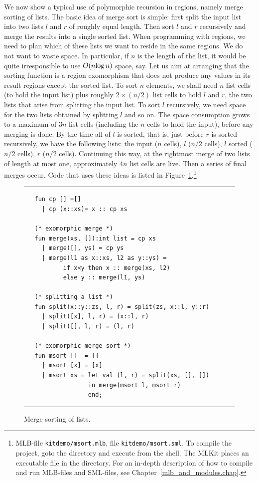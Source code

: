 \documentclass[12pt]{book}
\begin{document}
We now show a typical use of polymorphic recursion in regions, namely
merge sorting of lists. The basic idea of merge sort is simple: first
split the input list into two lists $l$ and $r$ of roughly equal
length.  Then sort $l$ and $r$ recursively and merge the results into
a single sorted list.  When programming with regions, we need to plan
which of these lists we want to reside in the same regions. We do not
want to waste space. In particular, if $n$ is the length of the list,
it would be quite irresponsible to use $O(n\hbox{log}\,n)$ space, say.
Let us aim at arranging that the sorting function is a region
exomorphism that does not produce any values in its result regions
except the sorted list. To sort $n$ elements, we shall need $n$ list
cells (to hold the input list) plus roughly $2\times(n/2)$ list cells
to hold $l$ and $r$, the two lists that arise from splitting the input
list. To sort $l$ recursively, we need space for the two lists
obtained by splitting $l$ and so on. The space consumption grows to a
maximum of $3n$ list cells (including the $n$ cells to hold the
input), before any merging is done.  By the time all of $l$ is sorted,
that is, just before $r$ is sorted recursively, we have the following
lists: the input ($n$ cells), $l$ ($n/2$ cells), $l$ sorted ($n/2$
cells), $r$ ($n/2$ cells). Continuing this way, at the rightmost merge
of two lists of length at most one, approximately $4n$ list cells are
live.  Then a series of final merges occur.  Code that uses these
ideas is listed in 
%
%
%
%
%
Figure~\ref{msort.fig}.\footnote{MLB-file {\tt kitdemo/msort.mlb}, file
  {\tt kitdemo/msort.sml}. To compile the project, goto the
   directory and execute  from
  the shell. The MLKit places an executable file  in the
   directory. For an in-depth description of how to
  compile and run MLB-files and SML-files, see
  Chapter~\ref{mlb_and_modules.chap}.}
\begin{figure}[hbt]
\hrule
\medskip
\begin{verbatim}
   fun cp [] =[]
     | cp (x::xs)= x :: cp xs

   (* exomorphic merge *)
   fun merge(xs, []):int list = cp xs
     | merge([], ys) = cp ys
     | merge(l1 as x::xs, l2 as y::ys) = 
           if x<y then x :: merge(xs, l2) 
           else y :: merge(l1, ys)

   (* splitting a list *)
   fun split(x::y::zs, l, r) = split(zs, x::l, y::r)
     | split([x], l, r) = (x::l, r)
     | split([], l, r) = (l, r)

   (* exomorphic merge sort *)
   fun msort []  = []
     | msort [x] = [x]
     | msort xs = let val (l, r) = split(xs, [], [])
                  in merge(msort l, msort r)
                  end;
\end{verbatim}
\caption{Merge sorting of lists.}
\label{msort.fig}
\medskip\hrule
\end{figure}
\end{document}

